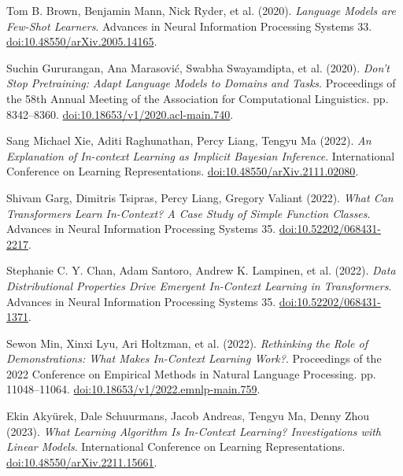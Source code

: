 Tom B. Brown, Benjamin Mann, Nick Ryder, et al. (2020). \textit{Language Models are Few-Shot Learners}. Advances in Neural Information Processing Systems 33.
\href{https://arxiv.org/abs/2005.14165}{doi:10.48550/arXiv.2005.14165}.

Suchin Gururangan, Ana Marasović, Swabha Swayamdipta, et al. (2020). \textit{Don't Stop Pretraining: Adapt Language Models to Domains and Tasks}. Proceedings of the 58th Annual Meeting of the Association for Computational Linguistics. pp. 8342--8360.
\href{https://aclanthology.org/2020.acl-main.740/}{doi:10.18653/v1/2020.acl-main.740}.

Sang Michael Xie, Aditi Raghunathan, Percy Liang, Tengyu Ma (2022). \textit{An Explanation of In-context Learning as Implicit Bayesian Inference}. International Conference on Learning Representations.
\href{https://arxiv.org/abs/2111.02080}{doi:10.48550/arXiv.2111.02080}.

Shivam Garg, Dimitris Tsipras, Percy Liang, Gregory Valiant (2022). \textit{What Can Transformers Learn In-Context? A Case Study of Simple Function Classes}. Advances in Neural Information Processing Systems 35.
\href{https://proceedings.neurips.cc/paper_files/paper/2022/hash/c529dba08a146ea8d6cf715ae8930cbe-Abstract-Conference.html}{doi:10.52202/068431-2217}.

Stephanie C. Y. Chan, Adam Santoro, Andrew K. Lampinen, et al. (2022). \textit{Data Distributional Properties Drive Emergent In-Context Learning in Transformers}. Advances in Neural Information Processing Systems 35.
\href{https://proceedings.neurips.cc/paper_files/paper/2022/hash/77c6ccacfd9962e2307fc64680fc5ace-Abstract-Conference.html}{doi:10.52202/068431-1371}.

Sewon Min, Xinxi Lyu, Ari Holtzman, et al. (2022). \textit{Rethinking the Role of Demonstrations: What Makes In-Context Learning Work?}. Proceedings of the 2022 Conference on Empirical Methods in Natural Language Processing. pp. 11048--11064.
\href{https://aclanthology.org/2022.emnlp-main.759/}{doi:10.18653/v1/2022.emnlp-main.759}.

Ekin Akyürek, Dale Schuurmans, Jacob Andreas, Tengyu Ma, Denny Zhou (2023). \textit{What Learning Algorithm Is In-Context Learning? Investigations with Linear Models}. International Conference on Learning Representations.
\href{https://arxiv.org/abs/2211.15661}{doi:10.48550/arXiv.2211.15661}.

